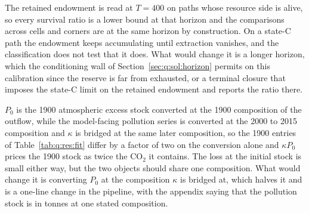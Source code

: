  The retained endowment is read at $T=400$ on paths whose resource side is alive, so every survival ratio is a lower bound at that horizon and the comparisons across cells and corners are at the same horizon by construction. On a state-C path the endowment keeps accumulating until extraction vanishes, and the classification does not test that it does. What would change it is a longer horizon, which the conditioning wall of Section~\ref{sec:q:sol:horizon} permits on this calibration since the reserve is far from exhausted, or a terminal closure that imposes the state-C limit on the retained endowment and reports the ratio there.

 $P_0$ is the 1900 atmospheric excess stock converted at the 1900 composition of the outflow, while the model-facing pollution series is converted at the 2000 to 2015 composition and $\kappa$ is bridged at the same later composition, so the 1900 entries of Table~\ref{tab:q:res:fit} differ by a factor of two on the conversion alone and $\kappa P_0$ prices the 1900 stock as twice the CO$_2$ it contains. The loss at the initial stock is small either way, but the two objects should share one composition. What would change it is converting $P_0$ at the composition $\kappa$ is bridged at, which halves it and is a one-line change in the pipeline, with the appendix saying that the pollution stock is in tonnes at one stated composition.

